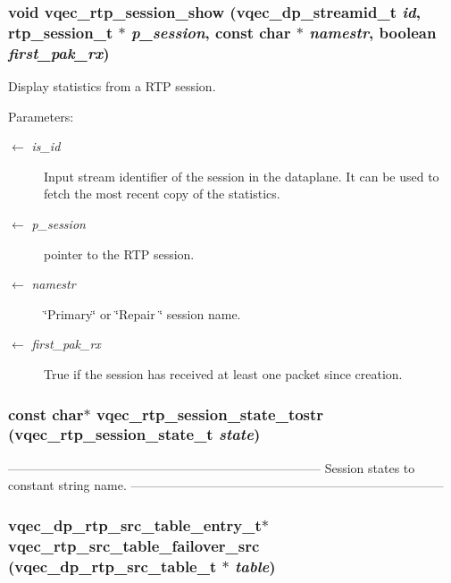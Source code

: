 \subsubsection{\setlength{\rightskip}{0pt plus 5cm}void vqec\_\-rtp\_\-session\_\-show (vqec\_\-dp\_\-streamid\_\-t {\em id}, rtp\_\-session\_\-t $\ast$ {\em p\_\-session}, const char $\ast$ {\em namestr}, boolean {\em first\_\-pak\_\-rx})}\label{vqec__rtp_8h_f7947081d49749e84e0395a351505a45}


Display statistics from a RTP session.

\begin{Desc}
\item[Parameters:]
\begin{description}
\item[\mbox{$\leftarrow$} {\em is\_\-id}]Input stream identifier of the session in the dataplane. It can be used to fetch the most recent copy of the statistics. \item[\mbox{$\leftarrow$} {\em p\_\-session}]pointer to the RTP session. \item[\mbox{$\leftarrow$} {\em namestr}]\char`\"{}Primary\char`\"{} or \char`\"{}Repair \char`\"{} session name. \item[\mbox{$\leftarrow$} {\em first\_\-pak\_\-rx}]True if the session has received at least one packet since creation. \end{description}
\end{Desc}
\subsubsection{\setlength{\rightskip}{0pt plus 5cm}const char$\ast$ vqec\_\-rtp\_\-session\_\-state\_\-tostr (\bf{vqec\_\-rtp\_\-session\_\-state\_\-t} {\em state})}\label{vqec__rtp_8h_21554655b6da62aa13f1f42a82e0202b}


--------------------------------------------------------------------------- Session states to constant string name. --------------------------------------------------------------------------- 
\subsubsection{\setlength{\rightskip}{0pt plus 5cm}vqec\_\-dp\_\-rtp\_\-src\_\-table\_\-entry\_\-t$\ast$ vqec\_\-rtp\_\-src\_\-table\_\-failover\_\-src (vqec\_\-dp\_\-rtp\_\-src\_\-table\_\-t $\ast$ {\em table})}\label{vqec__rtp_8h_9238e5b69456210d90b9eaa979b885c3}


